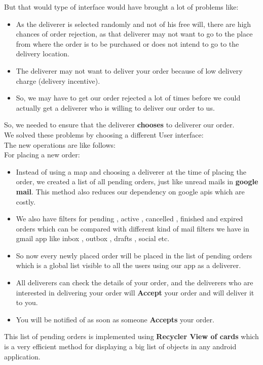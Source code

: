 \documentclass{report}
\begin{document}
But that would type of interface would have brought a lot of problems like:
\begin{itemize}
\item As the deliverer is selected randomly and not of his free will, there are high chances of order rejection, as that deliverer may not want to go to the place from where the order is to be purchased or does not intend to go to the delivery location.
\item The deliverer may not want to deliver your order because of low delivery charge (delivery incentive).
\item So, we may have to get our order rejected a lot of times before we could actually get a deliverer who is willing to deliver our order to us.
\end{itemize}

So, we needed to ensure that the deliverer \textbf{chooses} to deliverer our order.\\
\newline
We solved these problems by choosing a different User interface:\\
The new operations are like follows:\\
For placing a new order:
\begin{itemize}
\item Instead of using a map and choosing a deliverer at the time of placing the order, we created a list of all pending orders, just like unread mails in \textbf{google mail\cite{c6}}. This method also reduces our dependency on google apis which are costly.
\item We also have filters for pending , active , cancelled , finished and expired orders which can be compared with different kind of mail filters we have in gmail\cite{c6} app like inbox , outbox , drafts , social etc.
\item So now every newly placed order will be placed in the list of pending orders which is a global list visible to all the users using our app as a deliverer.
\item All deliverers can check the details of your order, and the deliverers who are interested in delivering your order will \textbf{Accept} your order and will deliver it to you.
\item You will be notified of  as soon as someone \textbf{Accepts} your order.
\end{itemize}
This list of pending orders is implemented using \textbf{Recycler View of cards} which is a very efficient method for displaying a big list of objects in any android application.
\end{document}
